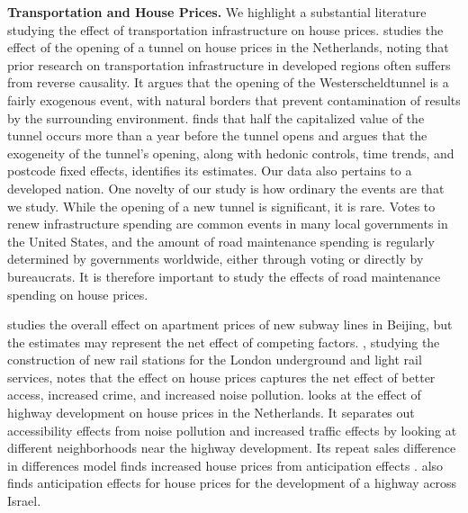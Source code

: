 {\bf Transportation and House Prices.} We highlight a substantial literature studying the effect of transportation infrastructure on house prices. \cite{hoogendoorn2019house} studies the effect of the opening of a tunnel on house prices in the Netherlands, noting that prior research on transportation infrastructure in developed regions often suffers from reverse causality. It argues that the opening of the Westerscheldtunnel is a fairly exogenous event, with natural borders that prevent contamination of results by the surrounding environment. \cite{hoogendoorn2019house} finds that half the capitalized value of the tunnel occurs more than a year before the tunnel opens and argues that the exogeneity of the tunnel's opening, along with hedonic controls, time trends, and postcode fixed effects, identifies its estimates. Our data also pertains to a developed nation. One novelty of our study is how ordinary the events are that we study. While the opening of a new tunnel is significant, it is rare. Votes to renew infrastructure spending are common events in many local governments in the United States, and the amount of road maintenance spending is regularly determined by governments worldwide, either through voting or directly by bureaucrats. It is therefore important to study the effects of road maintenance spending on house prices.

\cite{li2016wheels} studies the overall effect on apartment prices of new subway lines in Beijing, but the estimates may represent the net effect of competing factors. \cite{gibbons2005valuing}, studying the construction of new rail stations for the London underground and light rail services, notes that the effect on house prices captures the net effect of better access, increased crime, and increased noise pollution. \cite{levkovich2016effects} looks at the effect of highway development on house prices in the Netherlands. It separates out accessibility effects from noise pollution and increased traffic effects by looking at different neighborhoods near the highway development. Its repeat sales difference in differences model finds increased house prices from anticipation effects \citep{kohlhase1991impact}. \cite{beenstock2016hedonic} also finds anticipation effects for house prices for the development of a highway across Israel. 
 
